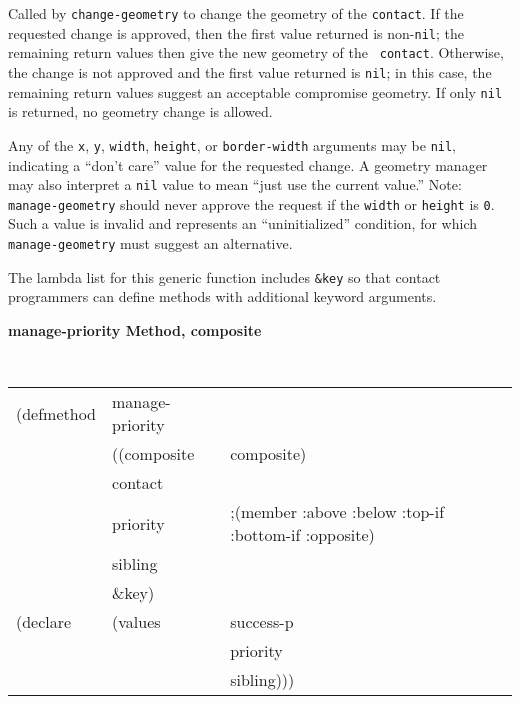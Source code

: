 \begin{flushright} 
\parbox[t]{6.125in}{
Called by {\tt change-geometry}
to change the geometry of the
{\tt contact}.
If the requested change is approved, then  the first value returned is
non-{\tt nil}; the remaining return values then give the new geometry of the {\tt
contact}.  Otherwise, the change is not approved and the first value returned is
{\tt nil}; in this case, the remaining return values suggest an acceptable
compromise geometry.
If only {\tt nil} is returned, no geometry change is allowed.
}

\parbox[t]{6.125in}{
Any of the {\tt x}, {\tt y}, {\tt width}, {\tt height}, or {\tt border-width}
arguments may be {\tt nil}, indicating a ``don't care'' value for the requested
change. A geometry manager may also interpret a {\tt nil} value to mean ``just
use the current value.''
Note: {\tt manage-geometry} should never approve the request if the {\tt width}
or {\tt height} is {\tt 0}. Such a value is invalid and represents an
``uninitialized'' condition, for which {\tt manage-geometry} must suggest
an alternative.
}

\parbox[t]{6.125in}{
The lambda list for this generic function includes {\tt \&key} so that contact
programmers can define methods with additional keyword arguments.
}
\end{flushright}
 
{\samepage
{\large {\bf manage-priority \hfill Method, composite}}
\begin{flushright} \parbox[t]{6.125in}{
\tt
\begin{tabular}{lll}
\raggedright
(defmethod & manage-priority & \\
& ((composite  &composite)\\
& contact\\
& priority & ;(member :above :below :top-if :bottom-if :opposite)\\
& sibling\\
& \&key) \\
(declare &(values &success-p\\
& & priority\\
& & sibling)))
\end{tabular}
\rm

}\end{flushright}}

